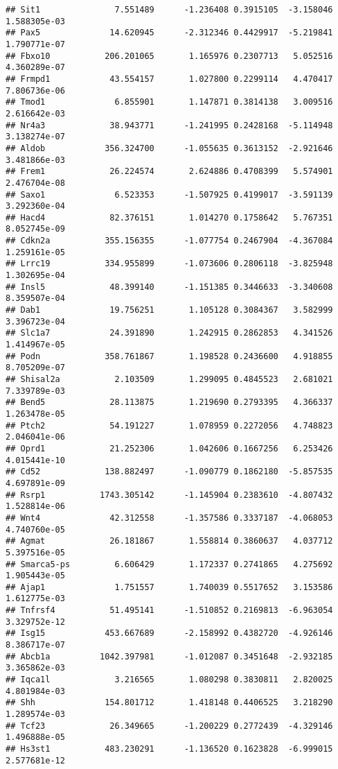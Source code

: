 \documentclass[
]{article}
\begin{document}
\begin{verbatim}
## Sit1               7.551489      -1.236408 0.3915105  -3.158046 1.588305e-03
## Pax5              14.620945      -2.312346 0.4429917  -5.219841 1.790771e-07
## Fbxo10           206.201065       1.165976 0.2307713   5.052516 4.360289e-07
## Frmpd1            43.554157       1.027800 0.2299114   4.470417 7.806736e-06
## Tmod1              6.855901       1.147871 0.3814138   3.009516 2.616642e-03
## Nr4a3             38.943771      -1.241995 0.2428168  -5.114948 3.138274e-07
## Aldob            356.324700      -1.055635 0.3613152  -2.921646 3.481866e-03
## Frem1             26.224574       2.624886 0.4708399   5.574901 2.476704e-08
## Saxo1              6.523353      -1.507925 0.4199017  -3.591139 3.292360e-04
## Hacd4             82.376151       1.014270 0.1758642   5.767351 8.052745e-09
## Cdkn2a           355.156355      -1.077754 0.2467904  -4.367084 1.259161e-05
## Lrrc19           334.955899      -1.073606 0.2806118  -3.825948 1.302695e-04
## Insl5             48.399140      -1.151385 0.3446633  -3.340608 8.359507e-04
## Dab1              19.756251       1.105128 0.3084367   3.582999 3.396723e-04
## Slc1a7            24.391890       1.242915 0.2862853   4.341526 1.414967e-05
## Podn             358.761867       1.198528 0.2436600   4.918855 8.705209e-07
## Shisal2a           2.103509       1.299095 0.4845523   2.681021 7.339789e-03
## Bend5             28.113875       1.219690 0.2793395   4.366337 1.263478e-05
## Ptch2             54.191227       1.078959 0.2272056   4.748823 2.046041e-06
## Oprd1             21.252306       1.042606 0.1667256   6.253426 4.015441e-10
## Cd52             138.882497      -1.090779 0.1862180  -5.857535 4.697891e-09
## Rsrp1           1743.305142      -1.145904 0.2383610  -4.807432 1.528814e-06
## Wnt4              42.312558      -1.357586 0.3337187  -4.068053 4.740760e-05
## Agmat             26.181867       1.558814 0.3860637   4.037712 5.397516e-05
## Smarca5-ps         6.606429       1.172337 0.2741865   4.275692 1.905443e-05
## Ajap1              1.751557       1.740039 0.5517652   3.153586 1.612775e-03
## Tnfrsf4           51.495141      -1.510852 0.2169813  -6.963054 3.329752e-12
## Isg15            453.667689      -2.158992 0.4382720  -4.926146 8.386717e-07
## Abcb1a          1042.397981      -1.012087 0.3451648  -2.932185 3.365862e-03
## Iqca1l             3.216565       1.080298 0.3830811   2.820025 4.801984e-03
## Shh              154.801712       1.418148 0.4406525   3.218290 1.289574e-03
## Tcf23             26.349665      -1.200229 0.2772439  -4.329146 1.496888e-05
## Hs3st1           483.230291      -1.136520 0.1623828  -6.999015 2.577681e-12

\end{verbatim}
\end{document}
